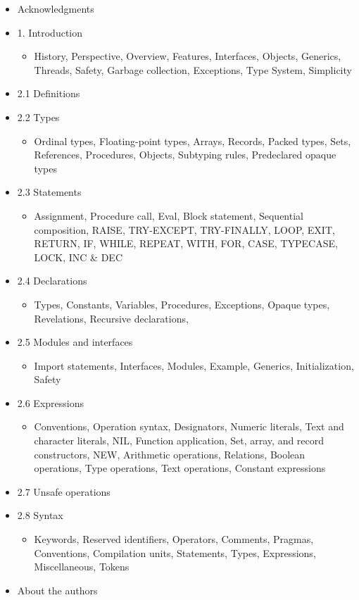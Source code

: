 \documentclass[10pt]{article}
\begin{document}
\begin{itemize}
\item Acknowledgments
\item 1. Introduction
\begin{itemize}
\item History, Perspective, Overview, Features, Interfaces, Objects, Generics, Threads, Safety, Garbage collection, Exceptions, Type System, Simplicity
\end{itemize}

\item 2.1 Definitions
\item 2.2 Types
\begin{itemize}
\item Ordinal types, Floating-point types, Arrays, Records, Packed types, Sets, References, Procedures, Objects, Subtyping rules, Predeclared opaque types
\end{itemize}

\item 2.3 Statements
\begin{itemize}
\item Assignment, Procedure call, Eval, Block statement, Sequential composition, RAISE, TRY-EXCEPT, TRY-FINALLY, LOOP, EXIT, RETURN, IF, WHILE, REPEAT, WITH, FOR, CASE, TYPECASE, LOCK, INC \& DEC
\end{itemize}

\item 2.4 Declarations
\begin{itemize}
\item Types, Constants, Variables, Procedures, Exceptions, Opaque types, Revelations, Recursive declarations, 
\end{itemize}

\item 2.5 Modules and interfaces
\begin{itemize}
\item Import statements, Interfaces, Modules, Example, Generics, Initialization, Safety
\end{itemize}

\item 2.6 Expressions
\begin{itemize}
\item Conventions, Operation syntax, Designators, Numeric literals, Text and character literals, NIL, Function application, Set, array, and record constructors, NEW, Arithmetic operations, Relations, Boolean operations, Type operations, Text operations, Constant expressions
\end{itemize}

\item 2.7 Unsafe operations
\item 2.8 Syntax
\begin{itemize}
\item Keywords, Reserved identifiers, Operators, Comments, Pragmas, Conventions, Compilation units, Statements, Types, Expressions, Miscellaneous, Tokens
\end{itemize}

\item About the authors
\end{itemize}
\end{document}
